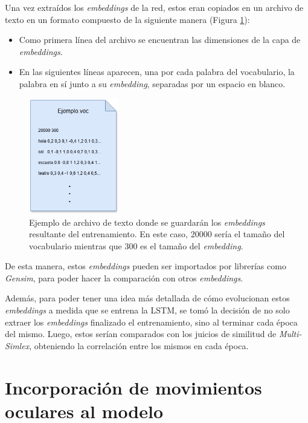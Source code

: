Una vez extraídos los \textit{embeddings} de la red, estos eran copiados en un archivo de texto en un formato compuesto de la siguiente manera (Figura \ref{fig:archivo_embedding}):

\begin{itemize}
    \item Como primera línea del archivo se encuentran las dimensiones de la capa de \textit{embeddings}.
    \item En las siguientes líneas aparecen, una por cada palabra del vocabulario, la palabra en sí junto a su \textit{embedding}, separadas por un espacio en blanco.
\end{itemize}

\begin{figure}[htb]
    \centering
    \includegraphics[width=0.35\textwidth]{imagenes/archivo.png}
    \caption{Ejemplo de archivo de texto donde se guardarán los \textit{embeddings} resultante del entrenamiento. En este caso, 20000 sería el tamaño del vocabulario mientras que 300 es el tamaño del \textit{embedding}.}
    \label{fig:archivo_embedding}
\end{figure}

De esta manera, estos \textit{embeddings} pueden ser importados por librerías como \textit{Gensim}, para poder hacer la comparación con otros \textit{embeddings}.

Además, para poder tener una idea más detallada de cómo evolucionan estos \textit{embeddings} a medida que se entrena la LSTM, se tomó la decisión de no solo extraer los \textit{embeddings} finalizado el entrenamiento, sino al terminar cada época del mismo. Luego, estos serían comparados con los juicios de similitud de \textit{Multi-Simlex}, obteniendo la correlación entre los mismos en cada época.

\section{Incorporación de movimientos oculares al modelo}

